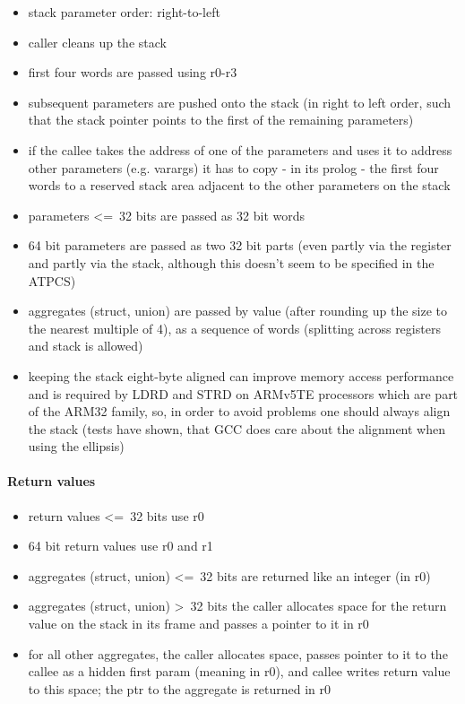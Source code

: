 \begin{itemize}
\item stack parameter order: right-to-left
\item caller cleans up the stack
\item first four words are passed using r0-r3
\item subsequent parameters are pushed onto the stack (in right to left order, such that the stack pointer points to the first of the remaining parameters)
\item if the callee takes the address of one of the parameters and uses it to address other parameters (e.g. varargs) it has to copy - in its prolog - the first four words to a reserved stack area adjacent to the other parameters on the stack
\item parameters \textless=\ 32 bits are passed as 32 bit words
\item 64 bit parameters are passed as two 32 bit parts (even partly via the register and partly via the stack, although this doesn't seem to be specified in the ATPCS)
\item aggregates (struct, union) are passed by value (after rounding up the size to the nearest multiple of 4), as a sequence of words (splitting across registers and stack is allowed)
\item keeping the stack eight-byte aligned can improve memory access performance and is required by LDRD and STRD on ARMv5TE processors which are part of the ARM32 family, so, in order to avoid problems one should always align the stack (tests have shown, that GCC does care about the alignment when using the ellipsis)
\end{itemize}

\paragraph{Return values}

\begin{itemize}
\item return values \textless=\ 32 bits use r0
\item 64 bit return values use r0 and r1
\item aggregates (struct, union) \textless=\ 32 bits are returned like an integer (in r0)
\item aggregates (struct, union) \textgreater\ 32 bits the caller allocates space for the return value on the stack in its frame and passes a pointer to it in r0
\item for all other aggregates, the caller allocates space, passes pointer to it to the callee as a hidden first param (meaning in r0), and callee writes return value to this space; the ptr to the aggregate is returned in r0
\end{itemize}

